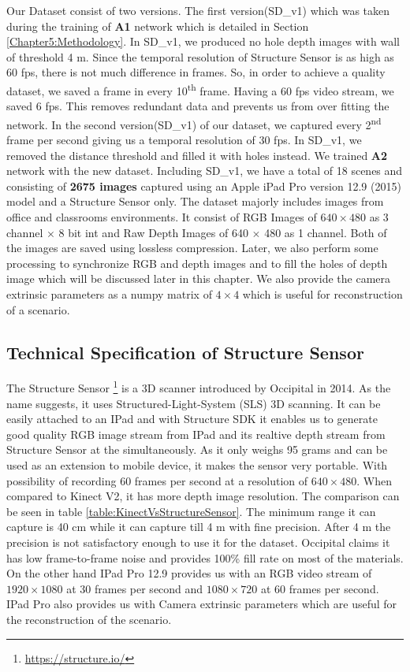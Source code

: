 Our Dataset consist of two versions. The first version(SD\_v1) which was taken during the training of \textbf{A1} network which is detailed in Section \ref{Chapter5:Methodology}. In SD\_v1, we produced no hole depth images with wall of threshold 4 m. Since the temporal resolution of Structure Sensor is as high as 60 fps, there is not much difference in frames. So, in order to achieve a quality dataset, we saved a frame in every 10\textsuperscript{th} frame. Having a 60 fps video stream, we saved 6 fps. This removes redundant data and prevents us from over fitting the network. In the second version(SD\_v1) of our dataset, we captured every 2\textsuperscript{nd} frame per second giving us a temporal resolution of 30 fps. In SD\_v1, we removed the distance threshold and filled it with holes instead. We trained \textbf{A2} network with the new dataset. Including SD\_v1, we have a total of 18 scenes and consisting of \textbf{2675 images} captured using an Apple iPad Pro version 12.9 (2015) model and a Structure Sensor only. The dataset majorly includes images from office and classrooms environments. It consist of RGB Images of $640\times480$ as 3 channel $\times$ 8 bit int and Raw Depth Images of 640 $\times$ 480 as 1 channel. Both of the images are saved using lossless compression. Later, we also perform some processing to synchronize RGB and depth images and to fill the holes of depth image which will be discussed later in this chapter. We also provide the camera extrinsic parameters as a numpy matrix of $4\times4$ which is useful for reconstruction of a scenario.\\



\subsection{Technical Specification of Structure Sensor}
The Structure Sensor \footnote{\url{https://structure.io/}} is a 3D scanner introduced by Occipital in 2014. As the name suggests, it uses Structured-Light-System (SLS) 3D scanning\cite{Kalantari}. It can be easily attached to an IPad and with Structure SDK it enables us to generate good quality RGB image stream from IPad and its realtive depth stream from Structure Sensor at the simultaneously. As it only weighs 95 grams and can be used as an extension to mobile device, it makes the sensor very portable. With possibility of recording 60 frames per second at a resolution of $640\times480$\cite{Kalantari}. When compared to Kinect V2, it has more depth image resolution. The comparison can be seen in table \ref{table:KinectVsStructureSensor}. The minimum range it can capture is 40 cm while it can capture till 4 m with fine precision. After 4 m the precision is not satisfactory enough to use it for the dataset. Occipital claims it has low frame-to-frame noise and provides 100\% fill rate on most of the materials. On the other hand IPad Pro 12.9 provides us with an RGB video stream of $1920\times1080$ at 30 frames per second and $1080\times720$ at 60 frames per second. IPad Pro also provides us with Camera extrinsic parameters which are useful for the reconstruction of the scenario.\\

